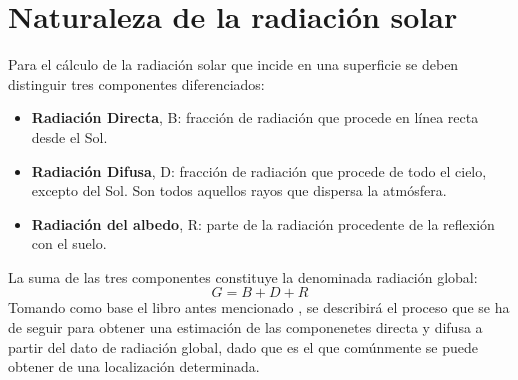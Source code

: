 \section{Naturaleza de la radiación solar}
\label{sec:orgeb2a189}
\label{sec:naturaleza-radiacion-solar}
Para el cálculo de la radiación solar que incide en una superficie se deben distinguir tres componentes diferenciados:
\begin{itemize}
\item \textbf{Radiación Directa}, B: fracción de radiación que procede en línea recta desde el Sol.
\item \textbf{Radiación Difusa}, D: fracción de radiación que procede de todo el cielo, excepto del Sol. Son todos aquellos rayos que dispersa la atmósfera.
\item \textbf{Radiación del albedo}, R: parte de la radiación procedente de la reflexión con el suelo.
\end{itemize}
La suma de las tres componentes constituye la denominada radiación global: 
\begin{equation}
G = B + D + R
\label{eq:comp_rad}
\end{equation}
Tomando como base el libro antes mencionado \cite{Perpinan2023}, se describirá el proceso que se ha de seguir para obtener una estimación de las componenetes directa y difusa a partir del dato de radiación global, dado que es el que comúnmente se puede obtener de una localización determinada.

